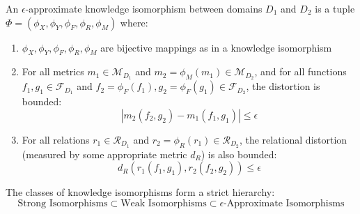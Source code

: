 \begin{definition}
An $\epsilon$-approximate knowledge isomorphism between domains $D_1$ and $D_2$ is a tuple $\Phi = (\phi_X, \phi_Y, \phi_F, \phi_R, \phi_M)$ where:
\begin{enumerate}
    \item $\phi_X, \phi_Y, \phi_F, \phi_R, \phi_M$ are bijective mappings as in a knowledge isomorphism
    \item For all metrics $m_1 \in \mathcal{M}_{D_1}$ and $m_2 = \phi_M(m_1) \in \mathcal{M}_{D_2}$, and for all functions $f_1, g_1 \in \mathcal{F}_{D_1}$ and $f_2 = \phi_F(f_1), g_2 = \phi_F(g_1) \in \mathcal{F}_{D_2}$, the distortion is bounded:
    \begin{equation}
    |m_2(f_2, g_2) - m_1(f_1, g_1)| \leq \epsilon
    \end{equation}
    
    \item For all relations $r_1 \in \mathcal{R}_{D_1}$ and $r_2 = \phi_R(r_1) \in \mathcal{R}_{D_2}$, the relational distortion (measured by some appropriate metric $d_R$) is also bounded:
    \begin{equation}
    d_R(r_1(f_1, g_1), r_2(f_2, g_2)) \leq \epsilon
    \end{equation}
\end{enumerate}
\end{definition}

\begin{theorem}
The classes of knowledge isomorphisms form a strict hierarchy:
\begin{equation}
\text{Strong Isomorphisms} \subset \text{Weak Isomorphisms} \subset \text{$\epsilon$-Approximate Isomorphisms}
\end{equation}
\end{theorem}

